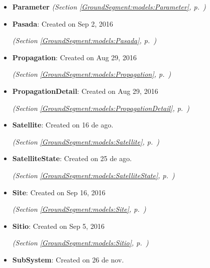 \begin{itemize}
\begin{itemize}
    \item \textbf{Parameter}
  \textit{(Section \ref{GroundSegment:models:Parameter}, p.~\pageref{GroundSegment:models:Parameter})}

    \item \textbf{Pasada}: Created on Sep 2, 2016



  \textit{(Section \ref{GroundSegment:models:Pasada}, p.~\pageref{GroundSegment:models:Pasada})}

    \item \textbf{Propagation}: Created on Aug 29, 2016



  \textit{(Section \ref{GroundSegment:models:Propagation}, p.~\pageref{GroundSegment:models:Propagation})}

    \item \textbf{PropagationDetail}: Created on Aug 29, 2016



  \textit{(Section \ref{GroundSegment:models:PropagationDetail}, p.~\pageref{GroundSegment:models:PropagationDetail})}

    \item \textbf{Satellite}: Created on 16 de ago.



  \textit{(Section \ref{GroundSegment:models:Satellite}, p.~\pageref{GroundSegment:models:Satellite})}

    \item \textbf{SatelliteState}: Created on 25 de ago.



  \textit{(Section \ref{GroundSegment:models:SatelliteState}, p.~\pageref{GroundSegment:models:SatelliteState})}

    \item \textbf{Site}: Created on Sep 16, 2016



  \textit{(Section \ref{GroundSegment:models:Site}, p.~\pageref{GroundSegment:models:Site})}

    \item \textbf{Sitio}: Created on Sep 5, 2016



  \textit{(Section \ref{GroundSegment:models:Sitio}, p.~\pageref{GroundSegment:models:Sitio})}

    \item \textbf{SubSystem}: Created on 26 de nov.




\end{itemize}
\end{itemize}

